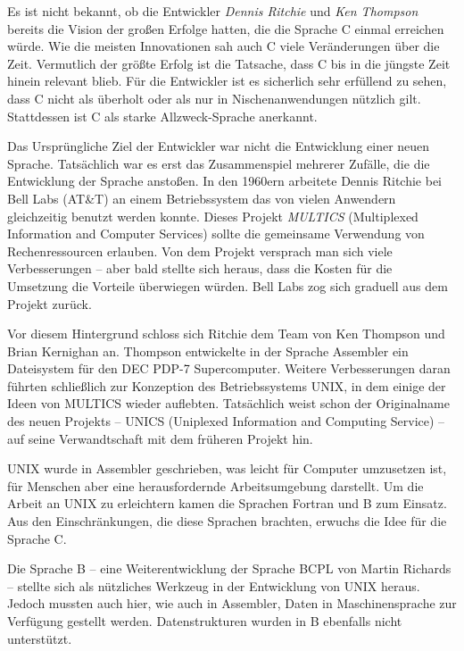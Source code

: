 \begin{appendices}
Es ist nicht bekannt, ob die Entwickler \emph{Dennis Ritchie} und \emph{Ken Thompson} bereits die Vision der großen Erfolge hatten, die die Sprache C einmal erreichen würde. Wie die meisten Innovationen sah auch C viele Veränderungen über die Zeit. Vermutlich der größte Erfolg ist die Tatsache, dass C bis in die jüngste Zeit hinein relevant blieb. Für die Entwickler ist es sicherlich sehr erfüllend zu sehen, dass C nicht als überholt oder als nur in Nischenanwendungen nützlich gilt. Stattdessen ist C als starke Allzweck-Sprache anerkannt.

Das Ursprüngliche Ziel der Entwickler war nicht die Entwicklung einer neuen Sprache. Tatsächlich war es erst das Zusammenspiel mehrerer Zufälle, die die Entwicklung der Sprache anstoßen. In den 1960ern arbeitete Dennis Ritchie bei Bell Labs (AT\&T) an einem Betriebssystem das von vielen Anwendern gleichzeitig benutzt werden konnte. Dieses Projekt \emph{MULTICS} (Multiplexed Information and Computer Services) sollte die gemeinsame Verwendung von Rechenressourcen erlauben. Von dem Projekt versprach man sich viele Verbesserungen -- aber bald stellte sich heraus, dass die Kosten für die Umsetzung die Vorteile überwiegen würden. Bell Labs zog sich graduell aus dem Projekt zurück.

Vor diesem Hintergrund schloss sich Ritchie dem Team von Ken Thompson und Brian Kernighan an. Thompson entwickelte in der Sprache Assembler ein Dateisystem für den DEC PDP-7 Supercomputer. Weitere Verbesserungen daran führten schließlich zur Konzeption des Betriebssystems UNIX, in dem einige der Ideen von MULTICS wieder auflebten. Tatsächlich weist schon der Originalname des neuen Projekts -- UNICS (Uniplexed Information and Computing Service) -- auf seine Verwandtschaft mit dem früheren Projekt hin.

UNIX wurde in Assembler geschrieben, was leicht für Computer umzusetzen ist, für Menschen aber eine herausfordernde Arbeitsumgebung darstellt. Um die Arbeit an UNIX zu erleichtern kamen die Sprachen Fortran und B zum Einsatz. Aus den Einschränkungen, die diese Sprachen brachten, erwuchs die Idee für die Sprache C.

Die Sprache B -- eine Weiterentwicklung der Sprache BCPL von Martin Richards -- stellte sich als nützliches Werkzeug in der Entwicklung von UNIX heraus. Jedoch mussten auch hier, wie auch in Assembler, Daten in Maschinensprache zur Verfügung gestellt werden. Datenstrukturen wurden in B ebenfalls nicht unterstützt.


\end{appendices}
